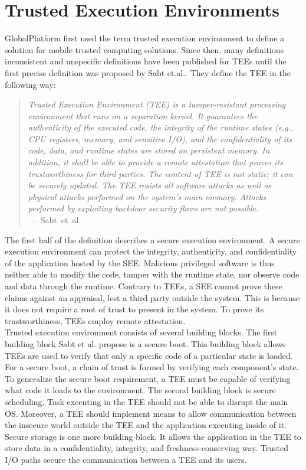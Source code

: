 \section{Trusted Execution Environments}
\label{sec:state:tee}

GlobalPlatform first used the term trusted execution environment to define a
solution for mobile trusted computing solutions.\cite{globaltee} Since then,
many definitions inconsistent and unspecific definitions have been published for
TEEs until the first precise definition was proposed by Sabt
et.al.\cite{sabt2015trusted}. They define the TEE in the following way:
\begin{quote}
    \textit{Trusted Execution Environment (TEE) is a tamper-resistant processing
        environment that runs on a separation kernel. It guarantees the authenticity of
        the executed code, the integrity of the runtime states (e.g., CPU registers,
        memory, and sensitive I/O), and the confidentiality of its code, data, and
        runtime states are stored on persistent memory. In addition, it shall be able
        to provide a remote attestation that proves its trustworthiness for third
        parties. The content of TEE is not static; it can be securely updated. The TEE
        resists all software attacks as well as physical attacks performed on the
        system's main memory. Attacks performed by exploiting backdoor security flaws
        are not possible. \\
    } \mbox{ -- Sabt et al.\cite{sabt2015trusted}}
\end{quote}

The first half of the definition describes a secure execution environment. A
secure execution environment can protect the integrity, authenticity, and
confidentiality of the application hosted by the SEE. Malicious privileged
software is thus neither able to modify the code, tamper with the runtime state,
nor observe code and data through the runtime. Contrary to TEEs, a SEE cannot
prove these claims against an appraisal, lest a third party outside the system.
This is because it does not require a root of trust to present in the system. To
prove its trustworthiness, TEEs employ remote attestation.\\

Trusted execution environment consists of several building blocks. The first
building block Sabt et al. propose is a secure boot. This building block allows
TEEs are used to verify that only a specific code of a particular state is
loaded. For a secure boot, a chain of trust is formed by verifying each
component's state. To generalize the secure boot requirement, a TEE must be
capable of verifying what code it loads to the environment. The second building
block is secure scheduling. Task executing in the TEE should not be able to
disrupt the main OS. Moreover, a TEE should implement means to allow
communication between the insecure world outside the TEE and the application
executing inside of it. Secure storage is one more building block. It allows the
application in the TEE to store data in a confidentiality, integrity, and
freshness-conserving way. Trusted I/O paths secure the communication between a
TEE and its users.

